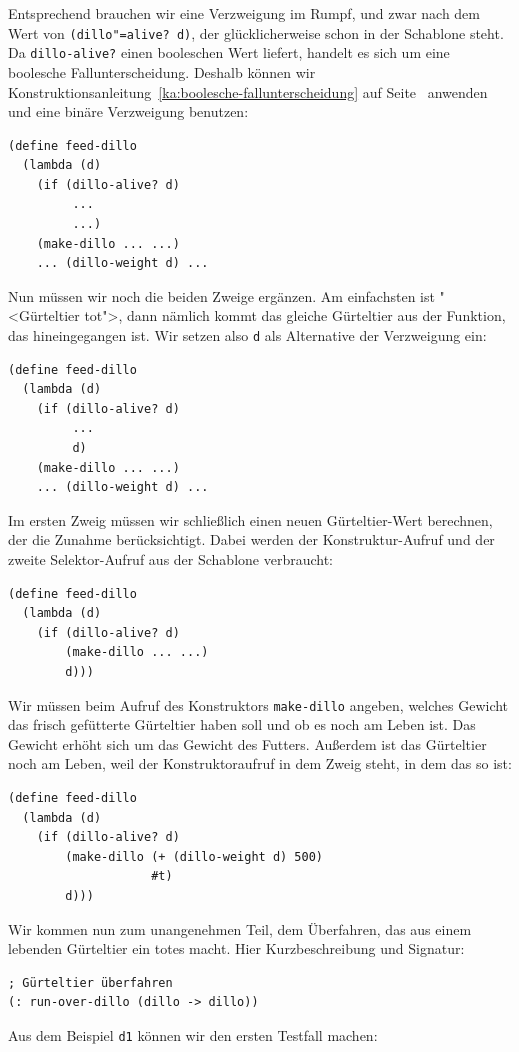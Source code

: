 Entsprechend brauchen wir eine Verzweigung im Rumpf, und zwar nach dem
Wert von \texttt{(dillo"=alive? d)}, der glücklicherweise schon in der
Schablone steht.  Da \texttt{dillo-alive?} einen booleschen Wert
liefert, handelt es sich um eine boolesche Fallunterscheidung.
Deshalb 
können wir Konstruktionsanleitung~\ref{ka:boolesche-fallunterscheidung}
auf Seite~\pageref{ka:boolesche-fallunterscheidung} anwenden und eine
binäre Verzweigung benutzen:
%
\begin{verbatim}
(define feed-dillo
  (lambda (d)
    (if (dillo-alive? d)
         ...
         ...)
    (make-dillo ... ...)
    ... (dillo-weight d) ...
\end{verbatim}
%
Nun müssen wir noch die beiden Zweige ergänzen.  Am
einfachsten ist "<Gürteltier tot">, dann nämlich kommt
das gleiche Gürteltier aus der Funktion, das hineingegangen ist.  Wir
setzen also \texttt{d} als Alternative der Verzweigung ein:
%
\begin{verbatim}
(define feed-dillo
  (lambda (d)
    (if (dillo-alive? d)
         ...
         d)
    (make-dillo ... ...)
    ... (dillo-weight d) ...
\end{verbatim}
%
Im ersten Zweig müssen wir schließlich einen neuen Gürteltier-Wert
berechnen, der die Zunahme berücksichtigt.  Dabei werden der
Konstruktur-Aufruf und der zweite Selektor-Aufruf aus der Schablone
verbraucht:
\begin{verbatim}
(define feed-dillo
  (lambda (d)
    (if (dillo-alive? d)
        (make-dillo ... ...)
        d)))
\end{verbatim}
%
Wir müssen beim Aufruf des Konstruktors \texttt{make-dillo} angeben,
welches Gewicht das frisch gefütterte Gürteltier haben soll und ob es
noch am Leben ist.  Das Gewicht erhöht sich um das Gewicht des
Futters.  Außerdem ist das Gürteltier noch am Leben, weil der
Konstruktoraufruf in dem Zweig steht, in dem das so ist:
%
\begin{verbatim}
(define feed-dillo
  (lambda (d)
    (if (dillo-alive? d)
        (make-dillo (+ (dillo-weight d) 500)
                    #t)
        d)))
\end{verbatim}
%
Wir kommen nun zum unangenehmen Teil, dem Überfahren, das aus einem
lebenden Gürteltier ein totes macht.  Hier Kurzbeschreibung und
Signatur:\label{page:run-over-dillo}
%
\begin{verbatim}
; Gürteltier überfahren
(: run-over-dillo (dillo -> dillo))
\end{verbatim}
%
Aus dem Beispiel \texttt{d1} können wir den ersten Testfall machen:
